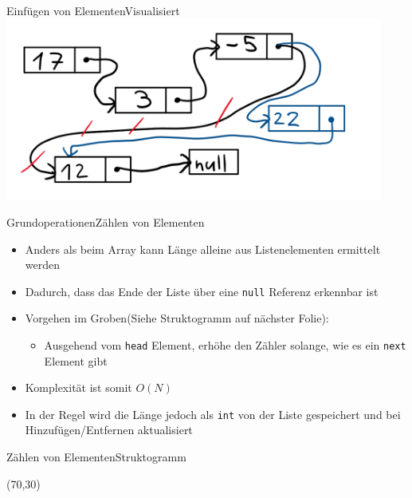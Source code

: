 \begin{frame}{Einfügen von Elementen}{Visualisiert}
\includegraphics[height=6cm]{graph/llist_insert}
\end{frame}

\begin{frame}{Grundoperationen}{Zählen von Elementen}
	\begin{itemize}
		\item Anders als beim Array kann Länge alleine aus Listenelementen ermittelt werden
		\item Dadurch, dass das Ende der Liste über eine \texttt{null} Referenz erkennbar ist
		\item Vorgehen im Groben(Siehe Struktogramm auf nächster Folie):
		\begin{itemize}
			\item Ausgehend vom \texttt{head} Element, erhöhe den Zähler solange, wie es ein \texttt{next} Element gibt
		\end{itemize}
		\item Komplexität ist somit $O(N)$
		\item In der Regel wird die Länge jedoch als \texttt{int} von der Liste gespeichert und bei Hinzufügen/Entfernen aktualisiert
	\end{itemize}
\end{frame}

\begin{frame}{Zählen von Elementen}{Struktogramm}
\begin{centernss}
	\begin{struktogramm}(70,30)
		\whileend
	\end{struktogramm}
\end{centernss}
\end{frame}

